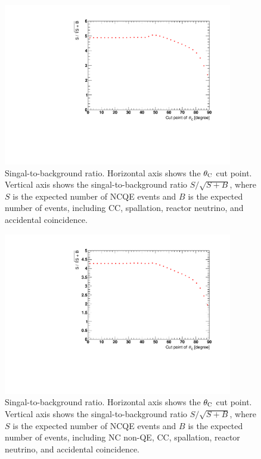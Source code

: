 \begin{figure}[h]
	\centering
	\includegraphics[width=10cm]{PDF/230526_SB/Figure_230526_SB_woNCnonQE}
	\caption[Singal-to-background ratio]{
	Singal-to-background ratio.
	Horizontal axis shows the $\theta_{\rm C}$ cut point.
	Vertical axis shows the singal-to-background ratio $S/\sqrt{S + B}$, where $S$ is the expected number of NCQE events and $B$ is the expected number of events, including CC, spallation, reactor neutrino, and accidental coincidence.
	}\label{Figure_230526_SB_woNCnonQE}
\end{figure}

\begin{figure}[h]
	\centering
	\includegraphics[width=10cm]{PDF/230526_SB/Figure_230526_SB}
	\caption[Singal-to-background ratio]{
	Singal-to-background ratio.
	Horizontal axis shows the $\theta_{\rm C}$ cut point.
	Vertical axis shows the singal-to-background ratio $S/\sqrt{S + B}$, where $S$ is the expected number of NCQE events and $B$ is the expected number of events, including NC non-QE, CC, spallation, reactor neutrino, and accidental coincidence.
	}\label{Figure_230526_SB}
\end{figure}

